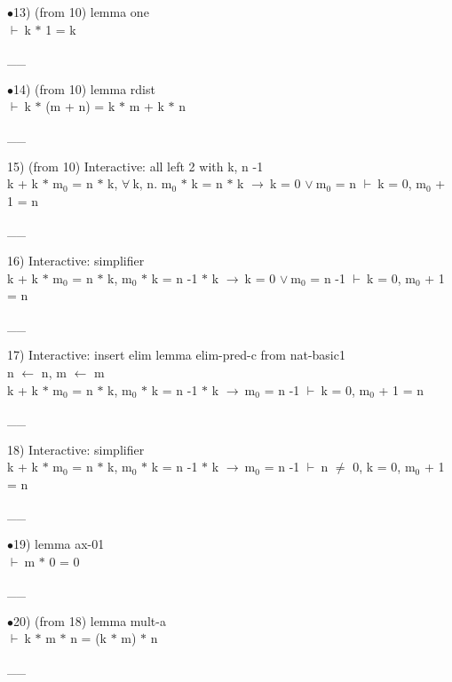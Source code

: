 \documentclass[a4paper]{article}
\newcommand{\Fol}{\mbox{$\vdash\ $}}
\newcommand{\Or}{\mbox{$\vee\ $}}
\newcommand{\Imp}{\mbox{$\rightarrow\ $}}
\newcommand{\All}{\mbox{$\forall\ $}}
\begin{document}
$\bullet$13)  (from 10) lemma one \\
 \Fol k $*$ 1 = k

\vspace{-1.5ex}\_\hrulefill \_

$\bullet$14)  (from 10) lemma rdist \\
 \Fol k $*$ (m + n) = k $*$ m + k $*$ n

\vspace{-1.5ex}\_\hrulefill \_

15)  (from 10) Interactive: all left  2 with k, n -1\\
k + k $*$ $\mbox{m}_{0}$ = n $*$ k, \All k, n. $\mbox{m}_{0}$ $*$ k = n $*$ k \Imp k = 0 \Or $\mbox{m}_{0}$ = n \Fol k = 0, $\mbox{m}_{0}$ + 1 = n

\vspace{-1.5ex}\_\hrulefill \_

16) Interactive: simplifier \\
k + k $*$ $\mbox{m}_{0}$ = n $*$ k, $\mbox{m}_{0}$ $*$ k = n -1 $*$ k \Imp k = 0 \Or $\mbox{m}_{0}$ = n -1 \Fol k = 0, $\mbox{m}_{0}$ + 1 = n

\vspace{-1.5ex}\_\hrulefill \_

17) Interactive: insert elim lemma  elim-pred-c from nat-basic1\\
n $\leftarrow$ n, m $\leftarrow$ m\\
k + k $*$ $\mbox{m}_{0}$ = n $*$ k, $\mbox{m}_{0}$ $*$ k = n -1 $*$ k \Imp $\mbox{m}_{0}$ = n -1 \Fol k = 0, $\mbox{m}_{0}$ + 1 = n

\vspace{-1.5ex}\_\hrulefill \_

18) Interactive: simplifier \\
k + k $*$ $\mbox{m}_{0}$ = n $*$ k, $\mbox{m}_{0}$ $*$ k = n -1 $*$ k \Imp $\mbox{m}_{0}$ = n -1 \Fol n $\neq$ 0, k = 0, $\mbox{m}_{0}$ + 1 = n

\vspace{-1.5ex}\_\hrulefill \_

$\bullet$19) lemma ax-01 \\
 \Fol m $*$ 0 = 0

\vspace{-1.5ex}\_\hrulefill \_

$\bullet$20)  (from 18) lemma mult-a \\
 \Fol k $*$ m $*$ n = (k $*$ m) $*$ n

\vspace{-1.5ex}\_\hrulefill \_
\end{document}
